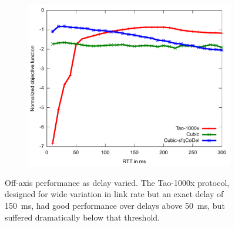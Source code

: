 \begin{figure}
\begin{subfigure}[b]{0.33\textwidth}
\end{subfigure}
\begin{subfigure}[b]{0.33\textwidth}
\includegraphics[width=\textwidth]{figures/rtt-agility-util.pdf}
\end{subfigure}
\caption{Off-axis performance as delay varied. The Tao-1000x protocol,
  designed for wide variation in link rate but an exact delay of
  150~ms, had good performance over delays above 50~ms, but suffered
  dramatically below that threshold.}
\label{fig:delay-agility}
\end{figure}

